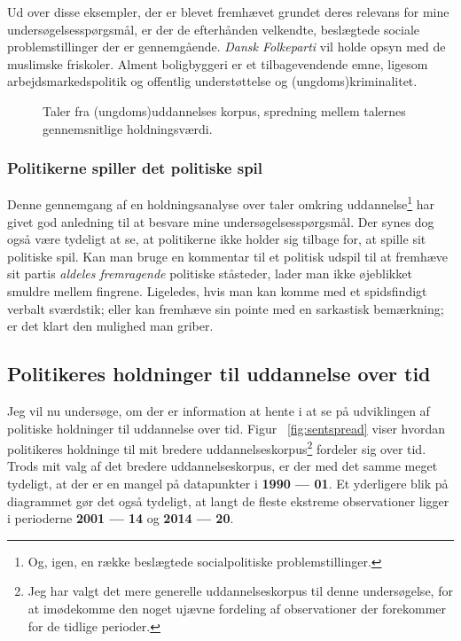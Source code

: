 Ud over disse eksempler, der er blevet fremhævet grundet deres relevans for mine undersøgelsesspørgsmål, er der de efterhånden velkendte, beslægtede sociale problemstillinger der er gennemgående.
\textit{Dansk Folkeparti} vil holde opsyn med de muslimske friskoler.
Alment boligbyggeri er et tilbagevendende emne, ligesom arbejdsmarkedspolitik og offentlig understøttelse og (ungdoms)kriminalitet.

\begin{figure}
  
\caption{Taler fra (ungdoms)uddannelses korpus, spredning mellem talernes gennemsnitlige holdningsværdi.}
\label{fig:sent_doc_mean}
\end{figure}

\subsubsection{Politikerne spiller det politiske spil}
Denne gennemgang af en holdningsanalyse over taler omkring uddannelse\footnote{
Og, igen, en række beslægtede socialpolitiske problemstillinger.} har givet god anledning til at besvare mine undersøgelsesspørgsmål.
Der synes dog også være tydeligt at se, at politikerne ikke holder sig tilbage for, at spille sit politiske spil.
Kan man bruge en kommentar til et politisk udspil til at fremhæve sit partis \textit{aldeles fremragende} politiske ståsteder, lader man ikke øjeblikket smuldre mellem fingrene.
Ligeledes, hvis man kan komme med et spidsfindigt verbalt sværdstik; eller kan fremhæve sin pointe med en sarkastisk bemærkning; er det klart den mulighed man griber.

\subsection{Politikeres holdninger til uddannelse over tid}

Jeg vil nu undersøge, om der er information at hente i at se på udviklingen af politiske holdninger til uddannelse over tid.
Figur ~\ref{fig:sentspread} viser hvordan politikeres holdninge til mit bredere uddannelseskorpus\footnote{Jeg har valgt det mere generelle uddannelseskorpus til denne undersøgelse, for at imødekomme den noget ujævne fordeling af observationer der forekommer for de tidlige perioder.}
fordeler sig over tid.
Trods mit valg af det bredere uddannelseskorpus, er der med det samme meget tydeligt, at der er en mangel på datapunkter i \textbf{1990 --- 01}.
Et yderligere blik på diagrammet gør det også tydeligt, at langt de fleste ekstreme observationer ligger i perioderne \textbf{2001 --- 14} og \textbf{2014 — 20}.

